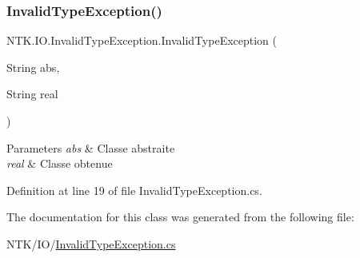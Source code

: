 \subsubsection{\texorpdfstring{InvalidTypeException()}{InvalidTypeException()}}
{\footnotesize\ttfamily N\+T\+K.\+I\+O.\+Invalid\+Type\+Exception.\+Invalid\+Type\+Exception (\begin{DoxyParamCaption}\item[{String}]{abs,  }\item[{String}]{real }\end{DoxyParamCaption})}






\begin{DoxyParams}{Parameters}
{\em abs} & Classe abstraite\\
\hline
{\em real} & Classe obtenue\\
\hline
\end{DoxyParams}


Definition at line 19 of file Invalid\+Type\+Exception.\+cs.



The documentation for this class was generated from the following file\+:\begin{DoxyCompactItemize}
\item 
N\+T\+K/\+I\+O/\mbox{\hyperlink{_invalid_type_exception_8cs}{Invalid\+Type\+Exception.\+cs}}\end{DoxyCompactItemize}
